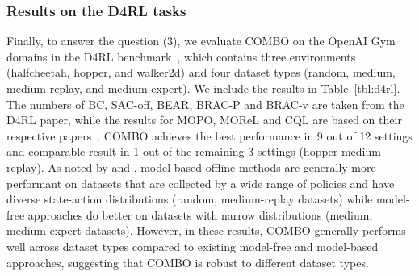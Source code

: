 \vspace*{-5pt}
\subsubsection{Results on the D4RL tasks}
\label{sec:d4rl_exps}

{Finally, to answer the question (3)}, we evaluate COMBO on the OpenAI Gym~\citep{brockman2016openai} domains in the D4RL benchmark~\citep{fu2020d4rl}, which contains three environments (halfcheetah, hopper, and walker2d) and four dataset types (random, medium, medium-replay, and medium-expert). We include the results in Table~\ref{tbl:d4rl}. The numbers of BC, SAC-off, BEAR, BRAC-P and BRAC-v are taken from the D4RL paper, while the results for MOPO, {MOReL} and CQL are based on their respective papers~\citep{yu2020mopo,kumar2020conservative}. 
{COMBO achieves the best performance in 9 out of 12 settings and comparable result in 1 out of the remaining 3 settings (hopper medium-replay).}
As noted by \citet{yu2020mopo} and \citet{Rafailov2020LOMPO}, model-based offline methods are generally more performant on datasets that are collected by a wide range of policies and have diverse state-action distributions (random, medium-replay datasets)
while model-free approaches do better on datasets with narrow distributions (medium, medium-expert datasets). However, in these results, {COMBO generally performs well across dataset types compared to existing model-free and model-based approaches, suggesting that COMBO is robust to different dataset types.} 


